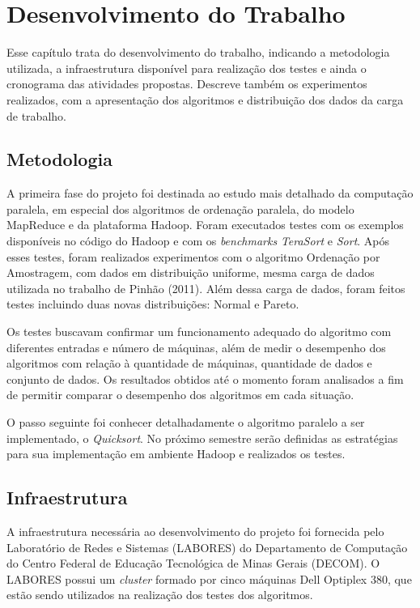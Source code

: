\chapter{Desenvolvimento do Trabalho}
\label{cap:desenvolvimento}

Esse capítulo trata do desenvolvimento do trabalho, indicando a metodologia utilizada, a infraestrutura disponível para realização dos testes e ainda o cronograma das atividades propostas. Descreve também os experimentos realizados, com a apresentação dos algoritmos e distribuição dos dados da carga de trabalho.

\section{Metodologia}

A primeira fase do projeto foi destinada ao estudo mais detalhado da computação paralela, em especial dos algoritmos de ordenação paralela, do modelo MapReduce e da plataforma Hadoop. Foram executados testes com os exemplos disponíveis no código do Hadoop e com os \textit{benchmarks} \textit{TeraSort} e \textit{Sort}. 
Após esses testes, foram realizados experimentos com o algoritmo Ordenação por Amostragem, com dados em distribuição uniforme, mesma carga de dados utilizada no trabalho de Pinhão (2011). Além dessa carga de dados, foram feitos testes incluindo duas novas distribuições: Normal e Pareto. 

Os testes buscavam confirmar um funcionamento adequado do algoritmo com diferentes entradas e número de máquinas, além de medir o desempenho dos algoritmos com relação à quantidade de máquinas, quantidade de dados e conjunto de dados. Os resultados obtidos até o momento foram analisados a fim de permitir comparar o desempenho dos algoritmos em cada situação.
 
O passo seguinte foi conhecer detalhadamente o algoritmo paralelo a ser implementado, o \textit{Quicksort}.  No próximo semestre serão definidas as estratégias para sua implementação em ambiente Hadoop e realizados os testes.

\section{Infraestrutura}

A infraestrutura necessária ao desenvolvimento do projeto foi fornecida pelo Laboratório de Redes e Sistemas (LABORES) do Departamento de Computação do Centro Federal de Educação Tecnológica de Minas Gerais (DECOM). O LABORES possui um \textit{cluster} formado por cinco máquinas Dell Optiplex 380, que estão sendo utilizados na realização dos testes dos algoritmos. 

